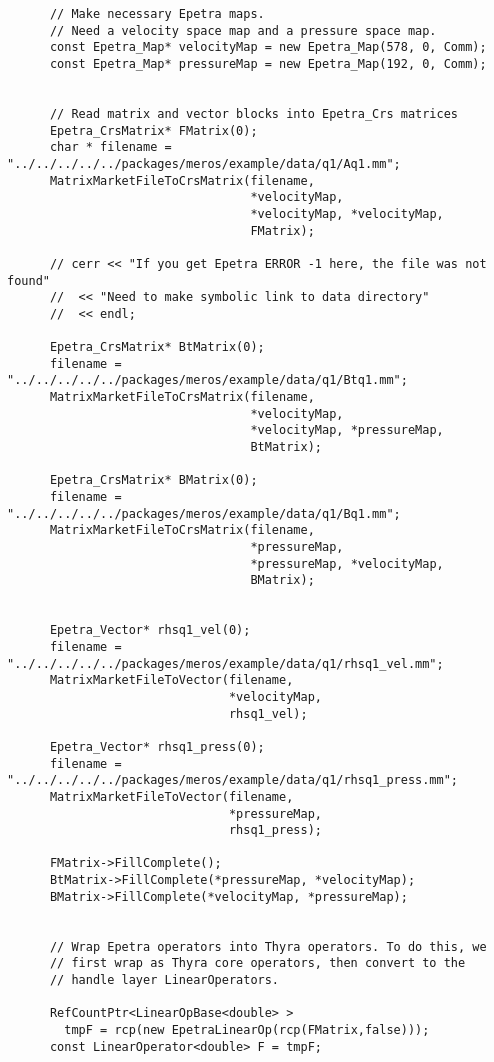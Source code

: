 \documentclass[oneeqnum,onefignum,onetabnum,10pt]{SANDreport}
\begin{document}
\begin{verbatim}
      // Make necessary Epetra maps.
      // Need a velocity space map and a pressure space map.
      const Epetra_Map* velocityMap = new Epetra_Map(578, 0, Comm); 
      const Epetra_Map* pressureMap = new Epetra_Map(192, 0, Comm); 
 

      // Read matrix and vector blocks into Epetra_Crs matrices
      Epetra_CrsMatrix* FMatrix(0);
      char * filename = "../../../../../packages/meros/example/data/q1/Aq1.mm";
      MatrixMarketFileToCrsMatrix(filename,
                                  *velocityMap,
                                  *velocityMap, *velocityMap,
                                  FMatrix);

      // cerr << "If you get Epetra ERROR -1 here, the file was not found"
      //  << "Need to make symbolic link to data directory" 
      //  << endl;

      Epetra_CrsMatrix* BtMatrix(0);
      filename = "../../../../../packages/meros/example/data/q1/Btq1.mm";
      MatrixMarketFileToCrsMatrix(filename,
                                  *velocityMap, 
                                  *velocityMap, *pressureMap,
                                  BtMatrix);

      Epetra_CrsMatrix* BMatrix(0);
      filename = "../../../../../packages/meros/example/data/q1/Bq1.mm";
      MatrixMarketFileToCrsMatrix(filename,
                                  *pressureMap,
                                  *pressureMap, *velocityMap,
                                  BMatrix);


      Epetra_Vector* rhsq1_vel(0);
      filename = "../../../../../packages/meros/example/data/q1/rhsq1_vel.mm";
      MatrixMarketFileToVector(filename,
                               *velocityMap, 
                               rhsq1_vel);

      Epetra_Vector* rhsq1_press(0);
      filename = "../../../../../packages/meros/example/data/q1/rhsq1_press.mm";
      MatrixMarketFileToVector(filename,
                               *pressureMap, 
                               rhsq1_press);

      FMatrix->FillComplete();
      BtMatrix->FillComplete(*pressureMap, *velocityMap);
      BMatrix->FillComplete(*velocityMap, *pressureMap);


      // Wrap Epetra operators into Thyra operators. To do this, we
      // first wrap as Thyra core operators, then convert to the
      // handle layer LinearOperators.
      
      RefCountPtr<LinearOpBase<double> >
        tmpF = rcp(new EpetraLinearOp(rcp(FMatrix,false)));
      const LinearOperator<double> F = tmpF;


\end{verbatim}
\end{document}
